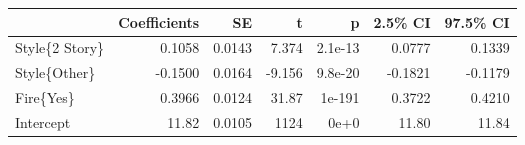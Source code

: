 \begin{tabular}{lrrrrrr}
\toprule
{} &  Coefficients &     SE &      t &       p &  2.5\% CI &  97.5\% CI \\
\midrule
Style\{2 Story\} &        0.1058 & 0.0143 &  7.374 & 2.1e-13 &   0.0777 &    0.1339 \\
Style\{Other\}   &       -0.1500 & 0.0164 & -9.156 & 9.8e-20 &  -0.1821 &   -0.1179 \\
Fire\{Yes\}      &        0.3966 & 0.0124 &  31.87 &  1e-191 &   0.3722 &    0.4210 \\
Intercept      &         11.82 & 0.0105 &   1124 &    0e+0 &    11.80 &     11.84 \\
\bottomrule
\end{tabular}
